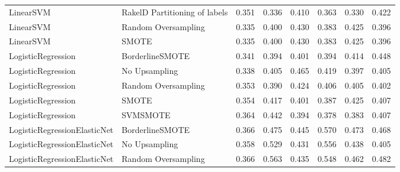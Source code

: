 \begin{tabular}{llllllll}
                      LinearSVM & RakelD Partitioning of labels & 0.351 &                     0.336 &                 0.410 &                  0.363 &                                   0.330 &    0.422 \\
                      LinearSVM &           Random Oversampling & 0.335 &                     0.400 &                 0.430 &                  0.383 &                                   0.425 &    0.396 \\
                      LinearSVM &                         SMOTE & 0.335 &                     0.400 &                 0.430 &                  0.383 &                                   0.425 &    0.396 \\
             LogisticRegression &               BorderlineSMOTE & 0.341 &                     0.394 &                 0.401 &                  0.394 &                                   0.414 &    0.448 \\
             LogisticRegression &                 No Upsampling & 0.338 &                     0.405 &                 0.465 &                  0.419 &                                   0.397 &    0.405 \\
             LogisticRegression &           Random Oversampling & 0.353 &                     0.390 &                 0.424 &                  0.406 &                                   0.405 &    0.402 \\
             LogisticRegression &                         SMOTE & 0.354 &                     0.417 &                 0.401 &                  0.387 &                                   0.425 &    0.407 \\
             LogisticRegression &                      SVMSMOTE & 0.364 &                     0.442 &                 0.394 &                  0.378 &                                   0.383 &    0.407 \\
   LogisticRegressionElasticNet &               BorderlineSMOTE & 0.366 &                     0.475 &                 0.445 &                  0.570 &                                   0.473 &    0.468 \\
   LogisticRegressionElasticNet &                 No Upsampling & 0.358 &                     0.529 &                 0.431 &                  0.556 &                                   0.438 &    0.405 \\
   LogisticRegressionElasticNet &           Random Oversampling & 0.366 &                     0.563 &                 0.435 &                  0.548 &                                   0.462 &    0.482 \\

\end{tabular}
